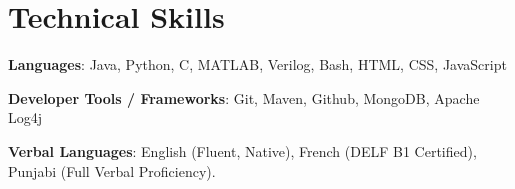 \documentclass[letterpaper,11pt]{article}
\begin{document}
\section{Technical Skills}
\begin{itemize}[leftmargin=0.15in, label={}]
\small{
\item{\textbf{Languages}{: Java, Python, C, MATLAB, Verilog, Bash, HTML, CSS, JavaScript} \\[1mm]}
\item{\textbf{Developer Tools / Frameworks}{: Git, Maven, Github, MongoDB, Apache Log4j} \\[1mm]}
\item{\textbf{Verbal Languages}{: English (Fluent, Native), French (DELF B1 Certified), Punjabi (Full Verbal Proficiency).} \\ [1mm]}
}
\end{itemize}
\vspace{-16pt}
\vspace{3pt}
\vspace{10pt}

\vspace{-15pt}
\end{document}

